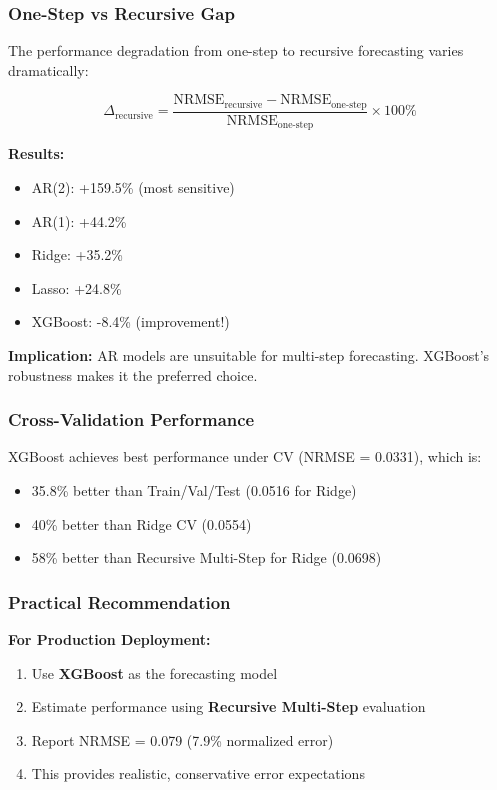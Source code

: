 \documentclass[12pt,a4paper]{article}
\begin{document}
\subsubsection{One-Step vs Recursive Gap}

The performance degradation from one-step to recursive forecasting varies dramatically:

\begin{equation}
\Delta_{\text{recursive}} = \frac{\text{NRMSE}_{\text{recursive}} - \text{NRMSE}_{\text{one-step}}}{\text{NRMSE}_{\text{one-step}}} \times 100\%
\end{equation}

\textbf{Results:}
\begin{itemize}
    \item AR(2): +159.5\% (most sensitive)
    \item AR(1): +44.2\%
    \item Ridge: +35.2\%
    \item Lasso: +24.8\%
    \item XGBoost: -8.4\% (improvement!)
\end{itemize}

\textbf{Implication:} AR models are unsuitable for multi-step forecasting. XGBoost's robustness makes it the preferred choice.

\subsubsection{Cross-Validation Performance}

XGBoost achieves best performance under CV (NRMSE = 0.0331), which is:
\begin{itemize}
    \item 35.8\% better than Train/Val/Test (0.0516 for Ridge)
    \item 40\% better than Ridge CV (0.0554)
    \item 58\% better than Recursive Multi-Step for Ridge (0.0698)
\end{itemize}

\subsubsection{Practical Recommendation}

\textbf{For Production Deployment:}
\begin{enumerate}
    \item Use \textbf{XGBoost} as the forecasting model
    \item Estimate performance using \textbf{Recursive Multi-Step} evaluation
    \item Report NRMSE = 0.079 (7.9\% normalized error)
    \item This provides realistic, conservative error expectations
\end{enumerate}
\end{document}
